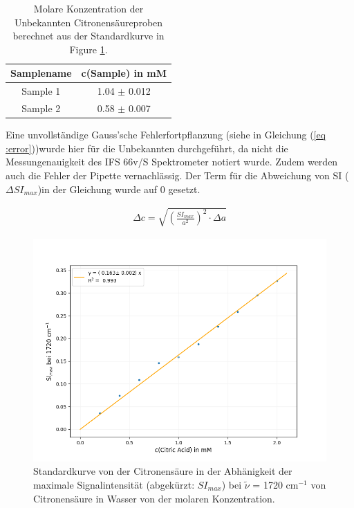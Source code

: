 \documentclass[10pt,a4paper]{article}
\begin{document}
			\begin{table}[H]
				\centering
				\caption{Molare Konzentration der Unbekannten Citronensäureproben berechnet aus der Standardkurve in Figure \ref{fig:Standardcurve}.}
				\label{tab:sampleconc}
				\begin{tabular}{cc}
					\toprule
					Samplename & c(Sample) in mM\\
					\midrule
					Sample 1 & 1.04 $\pm$ 0.012\\
					Sample 2 & 0.58 $\pm$ 0.007\\
					\bottomrule
				\end{tabular}
			\end{table}	

			Eine unvollständige Gauss'sche Fehlerfortpflanzung (siehe in Gleichung (\ref{eq :error}))wurde hier für die Unbekannten durchgeführt, da nicht die Messungenauigkeit des IFS 66v/S Spektrometer notiert wurde. Zudem werden auch die Fehler der Pipette vernachlässig. Der Term für die Abweichung von SI ($\Delta SI_{max}$)in der Gleichung wurde auf 0 gesetzt.
			
			\begin{equation}\label{eq :error}
				\begin{split}
					\Delta c = \sqrt{\left( \frac{SI_{max}}{a^2}\right)^2 \cdot \Delta a}
				\end{split}
			\end{equation}
			
		\begin{figure}[H]
			\centering
			\includegraphics[scale=0.55]{Standardcurve_Fit.png}
			\caption{Standardkurve von der Citronensäure in der Abhänigkeit der maximale Signalintensität (abgekürzt: $SI_{max}$) bei $\tilde{\nu}$ = 1720 cm$^{-1}$ von Citronensäure in Wasser von der molaren Konzentration. }
			\label{fig:Standardcurve}
		\end{figure}
		
\end{document}
